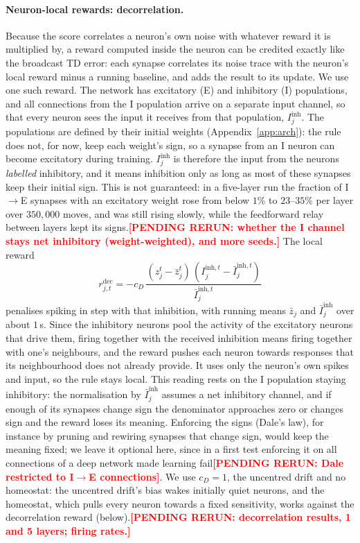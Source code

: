 \documentclass[10pt,twocolumn]{article}
\newcommand{\pending}[1]{\textcolor{red}{\bfseries[PENDING RERUN#1]}}
\begin{document}
\paragraph{Neuron-local rewards: decorrelation.}
Because the score correlates a neuron's own noise with whatever reward it is
multiplied by, a reward computed inside the neuron can be credited exactly like the
broadcast TD error: each synapse correlates its noise trace with the neuron's local
reward minus a running baseline, and adds the result to its update. We use one such
reward. The network has excitatory (E) and inhibitory (I) populations, and all
connections from the I population arrive on a separate input channel, so that every
neuron sees the input it receives from that population, $I^{\mathrm{inh}}_j$. The
populations are defined by their initial weights (Appendix~\ref{app:arch}): the rule
does not, for now, keep each weight's sign, so a synapse from an I neuron can become
excitatory during training. $I^{\mathrm{inh}}_j$ is therefore the input from the
neurons \emph{labelled} inhibitory, and it means inhibition only as long as most of
these synapses keep their initial sign. This is not guaranteed: in a five-layer run
the fraction of I$\to$E synapses with an excitatory weight rose from below $1\%$ to
$23$--$35\%$ per layer over $350{,}000$ moves, and was still rising slowly, while the
feedforward relay between layers kept its signs.\pending{: whether the I channel stays
net inhibitory (weight-weighted), and more seeds.} The local reward
\begin{equation}
r^{\mathrm{dec}}_{j,t}=-c_D\,\frac{(z^t_j-\bar z^t_j)\,(I^{\mathrm{inh},t}_j-\bar I^{\mathrm{inh},t}_j)}{\bar I^{\mathrm{inh},t}_j}
\label{eq:decorr}
\end{equation}
penalises spiking in step with that inhibition, with running means $\bar z_j$ and
$\bar I^{\mathrm{inh}}_j$ over about $1$\,s. Since the inhibitory neurons pool the
activity of the excitatory neurons that drive them, firing together with the received
inhibition means firing together with one's neighbours, and the reward pushes each neuron
towards responses that its neighbourhood does not already provide. It uses only the
neuron's own spikes and input, so the rule stays local. This reading rests on the
I population staying inhibitory: the normalisation by $\bar I^{\mathrm{inh}}_j$ assumes
a net inhibitory channel, and if enough of its synapses change sign the denominator
approaches zero or changes sign and the reward loses its meaning. Enforcing the signs
(Dale's law), for instance by pruning and rewiring synapses that change sign, would keep
the meaning fixed; we leave it optional here, since in a first test enforcing it on all
connections of a deep network made learning fail\pending{: Dale restricted to
I$\to$E connections}. We use $c_D=1$, the uncentred
drift and no homeostat: the uncentred drift's bias wakes initially quiet neurons, and
the homeostat, which pulls every neuron towards a fixed sensitivity, works against the
decorrelation reward (below).\pending{: decorrelation results, 1 and 5 layers; firing
rates.}
\end{document}
